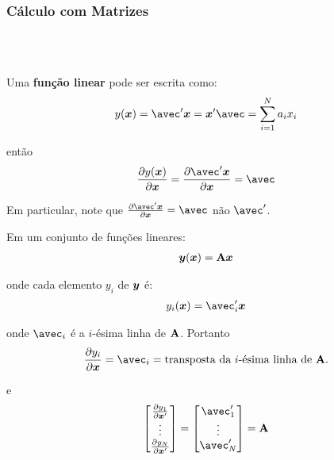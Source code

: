\documentclass[11pt, oneside, a4paper, article]{article}
\numberwithin{equation}{section}
\begin{document}
\begin{description}
\subsubsection{Cálculo com Matrizes}
\noindent
\citet[A.8, p.1007]{greene-7ed}\\
\citet[C.23, p.157]{matman} \\
\citet[Sec.2.3, p.10]{matcook2012} 

\vspace{1 em}
Uma \textbf{função linear} pode ser escrita como:
\begin{align*}
	y(\xvec) = \avec' \xvec = \xvec' \avec = \sum_{i=1}^{N}a_{i} x_{i}
\end{align*}

\noindent
então
\begin{align*}
	\pdf{y(\xvec)}{\xvec} = \pdf{\avec' \xvec}{\xvec} = \avec
\end{align*}

\noindent
Em particular, note que $\pdf{\avec'\xvec}{\xvec} = \avec$ não $\avec'$.

\vspace{1 em}
\noindent
Em um conjunto de funções lineares:
\begin{align*}
	\boldsymbol{y} (\boldsymbol{x}) = \mathbf{A} \boldsymbol{x} 
\end{align*}

\noindent
onde cada elemento $y_{i}$ de $\boldsymbol{y}$ é:
\begin{align*}
	y_{i}(\xvec) = \avec_{i}' \xvec 
\end{align*}

\noindent
onde $\avec_{i}$ é a $i$-ésima linha de $\mathbf{A}$.
Portanto
\begin{align*}
	\pdf{y_{i}}{\xvec} = \avec_{i} = \text{transposta da $i$-ésima linha de $\Amat$}.
\end{align*}

\noindent e
\begin{align*}
\begin{bmatrix}
\pdf{y_{1}}{\xvec'}	\\ \vdots \\ \pdf{y_{N}}{\xvec'}	
\end{bmatrix}
=
\begin{bmatrix}
\avec_{1}'	\\ \vdots \\ \avec_{N}'
\end{bmatrix}
= \Amat
\end{align*}


\end{description}
\end{document}
